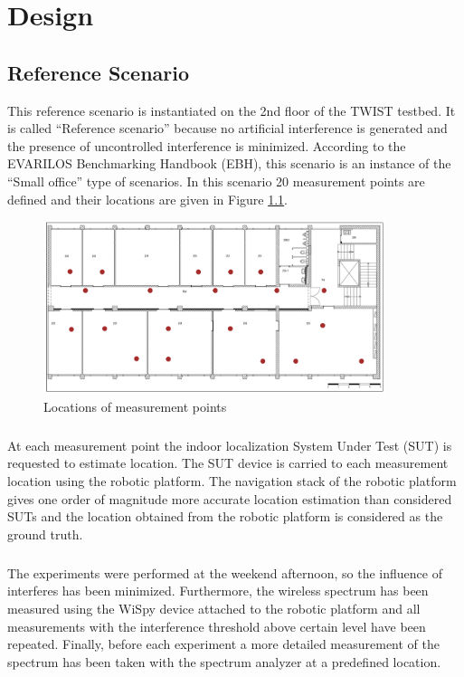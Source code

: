 \documentclass[11pt,a4paper,headinclude,footinclude,chapterprefix=on]{scrreprt}
\begin{document}
\chapter{Design} 
\section{Reference Scenario} This reference scenario is instantiated on the 2nd floor of the TWIST testbed. It is called “Reference scenario” because no artificial interference is generated and the presence of uncontrolled interference is minimized. According to the EVARILOS Benchmarking Handbook (EBH), this scenario is an instance of the “Small office” type of scenarios. In this scenario 20 measurement points are defined and their locations are given in Figure \ref{fig:floor}. 
\begin{figure}
	[!h] \centering 
	\includegraphics[width=100mm]{Images/floor} \caption{Locations of measurement points} \label{fig:floor} 
\end{figure}

\paragraph{} At each measurement point the indoor localization System Under Test (SUT) is requested to estimate location. The SUT device is carried to each measurement location using the robotic platform. The navigation stack of the robotic platform gives one order of magnitude more accurate location estimation than considered SUTs and the location obtained from the robotic platform is considered as the ground truth.

\paragraph{} The experiments were performed at the weekend afternoon, so the influence of interferes has been minimized. Furthermore, the wireless spectrum has been measured using the WiSpy device attached to the robotic platform and all measurements with the interference threshold above certain level have been repeated. Finally, before each experiment a more detailed measurement of the spectrum has been taken with the spectrum analyzer at a predefined location.
\end{document}
